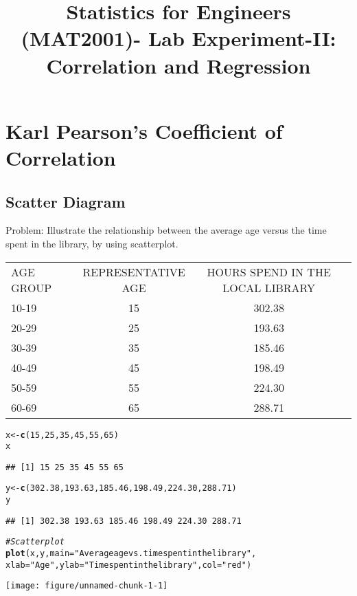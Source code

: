 \documentclass{article}\usepackage[]{graphicx}\usepackage[]{xcolor}
\date{}
\title{Statistics for Engineers (MAT2001)- Lab  Experiment-II:  Correlation and Regression}
\makeatletter
\def\maxwidth{ %
  \ifdim\Gin@nat@width>\linewidth
    \linewidth
  \else
    \Gin@nat@width
  \fi
}
\newcommand{\hlnum}[1]{\textcolor[rgb]{0.686,0.059,0.569}{#1}}%
\newcommand{\hlsng}[1]{\textcolor[rgb]{0.192,0.494,0.8}{#1}}%
\newcommand{\hlcom}[1]{\textcolor[rgb]{0.678,0.584,0.686}{\textit{#1}}}%
\newcommand{\hldef}[1]{\textcolor[rgb]{0.345,0.345,0.345}{#1}}%
\newcommand{\hlkwb}[1]{\textcolor[rgb]{0.69,0.353,0.396}{#1}}%
\newcommand{\hlkwc}[1]{\textcolor[rgb]{0.333,0.667,0.333}{#1}}%
\newcommand{\hlkwd}[1]{\textcolor[rgb]{0.737,0.353,0.396}{\textbf{#1}}}%
\newenvironment{kframe}{%
 \def\at@end@of@kframe{}%
 \ifinner\ifhmode%
  \def\at@end@of@kframe{\end{minipage}}%
  \begin{minipage}{\columnwidth}%
 \fi\fi%
 \def\FrameCommand##1{\hskip\@totalleftmargin \hskip-\fboxsep
 \colorbox{shadecolor}{##1}\hskip-\fboxsep
     \hskip-\linewidth \hskip-\@totalleftmargin \hskip\columnwidth}%
 \MakeFramed {\advance\hsize-\width
   \@totalleftmargin\z@ \linewidth\hsize
   \@setminipage}}%
 {\par\unskip\endMakeFramed%
 \at@end@of@kframe}
\newenvironment{knitrout}{}{} %
\makeatother
\begin{document}
\maketitle

\section{Karl Pearson’s Coefficient of Correlation}
\subsection{Scatter Diagram}
Problem: \newline
Illustrate the relationship between the average age versus the time spent in the
library, by using scatterplot.
\begin{table}[h]
\begin{tabular}{lccc}
AGE
GROUP & REPRESENTATIVE
AGE & HOURS SPEND IN THE LOCAL
LIBRARY &    \\
10-19 & 15  & 302.38  &    \\
20-29 & 25  & 193.63  &  \\
30-39 & 35  & 185.46  &   \\
40-49 & 45  & 198.49  &    \\
50-59 & 55  & 224.30  &    \\
60-69 & 65  & 288.71  &  
\end{tabular}
\end{table}
\begin{knitrout}
\color{fgcolor}\begin{kframe}
\begin{alltt}
\hldef{x} \hlkwb{<-} \hlkwd{c}\hldef{(}\hlnum{15}\hldef{,}\hlnum{25}\hldef{,}\hlnum{35}\hldef{,}\hlnum{45}\hldef{,}\hlnum{55}\hldef{,}\hlnum{65}\hldef{)}
\hldef{x}
\end{alltt}
\begin{verbatim}
## [1] 15 25 35 45 55 65
\end{verbatim}
\begin{alltt}
\hldef{y} \hlkwb{<-} \hlkwd{c}\hldef{(}\hlnum{302.38}\hldef{,} \hlnum{193.63}\hldef{,} \hlnum{185.46}\hldef{,} \hlnum{198.49}\hldef{,} \hlnum{224.30}\hldef{,} \hlnum{288.71}\hldef{)}
\hldef{y}
\end{alltt}
\begin{verbatim}
## [1] 302.38 193.63 185.46 198.49 224.30 288.71
\end{verbatim}
\begin{alltt}
\hlcom{# Scatter plot}
\hlkwd{plot}\hldef{(x,y,} \hlkwc{main}\hldef{=}\hlsng{"Average age vs. time spent in the library"}\hldef{,}
     \hlkwc{xlab}\hldef{=}\hlsng{"Age"}\hldef{,} \hlkwc{ylab}\hldef{=}\hlsng{"Time spent in the library"}\hldef{,}\hlkwc{col}\hldef{=}\hlsng{"red"}\hldef{)}
\end{alltt}
\end{kframe}
\texttt{[image: figure/unnamed-chunk-1-1]} 
\end{knitrout}
\end{document}
